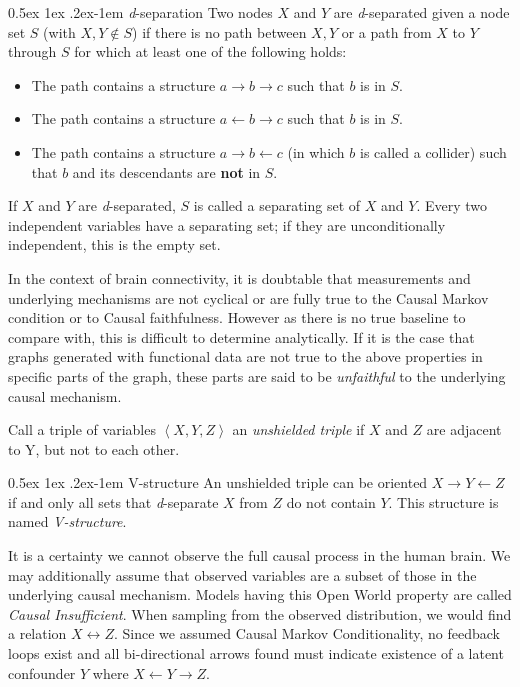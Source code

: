 \documentclass[a4paper, 10pt, english, onecolumn]{article}
\makeatletter
\renewcommand{\paragraph}{%
  \@startsection{paragraph}{4}%
  {\z@}{0.5ex \@plus 1ex \@minus .2ex}{-1em}%
  {\normalfont\normalsize\bfseries}%
}
\makeatother
\begin{document}
\paragraph{\textit{d}-separation}
Two nodes $X$ and $Y$ are \textit{d}-separated given a node set $S$ (with $X, Y \notin S$) if there is no path between $X,Y$ or a path from $X$ to $Y$ through $S$ for which at least one of the following holds:
\begin{itemize}
\item The path contains a structure $a \rightarrow b \rightarrow c$ such that $b$ is in $S$.
\item The path contains a structure $a \leftarrow b \rightarrow c$ such that $b$ is in $S$.
\item The path contains a structure $a \rightarrow b \leftarrow c$ (in which $b$ is called a collider) such that $b$ and its descendants are \textbf{not} in $S$.
\end{itemize}
If $X$ and $Y$ are \textit{d}-separated, $S$ is called a separating set of $X$ and $Y$.
Every two independent variables have a separating set; if they are unconditionally independent, this is the empty set.

In the context of brain connectivity, it is doubtable that measurements and underlying mechanisms are not cyclical or are fully true to the Causal Markov condition or to Causal faithfulness.
However as there is no true baseline to compare with, this is difficult to determine analytically.
If it is the case that graphs generated with functional data are not true to the above properties in specific parts of the graph, these parts are said to be \textit{unfaithful} to the underlying causal mechanism.

Call a triple of variables $\left < X,Y,Z \right >$ an \textit{unshielded triple} if $X$ and $Z$ are adjacent to Y, but not to each other.

\paragraph{V-structure}
An unshielded triple can be oriented $X \rightarrow Y \leftarrow Z$ if and only all sets that \textit{d}-separate $X$ from $Z$ do not contain $Y$.
This structure is named \textit{V-structure}.

It is a certainty we cannot observe the full causal process in the human brain.
We may additionally assume that observed variables are a subset of those in the underlying causal mechanism.
Models having this Open World property are called \textit{Causal Insufficient}.
When sampling from the observed distribution, we would find a relation $X \leftrightarrow Z$.
Since we assumed Causal Markov Conditionality, no feedback loops exist and all bi-directional arrows found must indicate existence of a latent confounder $Y$ where $X \leftarrow Y \rightarrow Z$.
\end{document}
